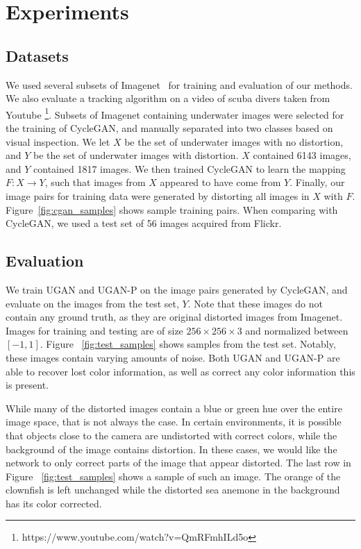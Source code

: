 \section{Experiments}
\label{sec:experiments}

\subsection{Datasets}
We used several subsets of Imagenet~\cite{deng2009imagenet} for training and evaluation of our methods. We also evaluate a 
tracking
algorithm on a video of scuba divers taken from Youtube \footnote{https://www.youtube.com/watch?v=QmRFmhILd5o}. Subsets of 
Imagenet
containing underwater images were selected for the training of CycleGAN, and manually separated into two classes based on visual
inspection. We let $X$ be the set of underwater images with no distortion, and $Y$ be the set of underwater images with 
distortion. $X$
contained 6143 images, and $Y$ contained 1817 images. We then trained CycleGAN to learn the mapping $F: X \rightarrow Y$, such 
that images
from $X$ appeared to have come from $Y$. Finally, our image pairs for training data were generated by distorting all images in $X$ 
with
$F$. Figure~\ref{fig:cgan_samples} shows sample training pairs. When comparing with CycleGAN, we used a test set of 56 images 
acquired from
Flickr\texttrademark .

\subsection{Evaluation}
We train UGAN and UGAN-P on the image pairs generated by CycleGAN, and evaluate on the images from the
test set, $Y$. Note that these images do not contain any ground truth, as they are original distorted images from
Imagenet. Images for training and testing are of size $256 \times 256 \times 3$ and normalized between $[-1, 1]$.
Figure ~\ref{fig:test_samples} shows samples from the test set. Notably, these images contain varying amounts of noise. Both UGAN 
and UGAN-P
are able to recover lost color information, as well as correct any color information this is present. 

While many of the distorted images contain a blue or green hue over the entire image space, that is not always the case.
In certain environments,
it is possible that objects close to the camera are undistorted with correct colors, while the background
of the image contains distortion. In these cases, we would like the network to only correct parts of the image that
appear distorted. The last row in Figure ~\ref{fig:test_samples} shows a sample of such an image. The orange of the clownfish is 
left
unchanged while the distorted sea anemone in the background has its color corrected.

